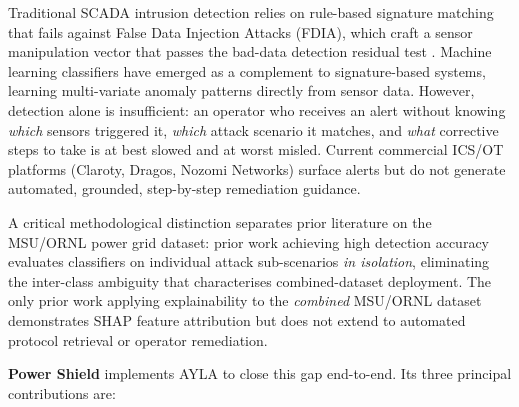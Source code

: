 \documentclass[twocolumn, 10pt, letterpaper]{article}
\begin{document}
Traditional SCADA intrusion detection relies on rule-based signature matching that
fails against False Data Injection Attacks (FDIA), which craft a sensor manipulation
vector that passes the bad-data detection residual test \cite{liu2011fdia}.
Machine learning classifiers have emerged as a complement to signature-based systems,
learning multi-variate anomaly patterns directly from sensor data.
However, detection alone is insufficient: an operator who receives an alert without
knowing \textit{which} sensors triggered it, \textit{which} attack scenario it matches,
and \textit{what} corrective steps to take is at best slowed and at worst misled.
Current commercial ICS/OT platforms (Claroty, Dragos, Nozomi Networks) surface alerts
but do not generate automated, grounded, step-by-step remediation guidance.

A critical methodological distinction separates prior literature on the
MSU/ORNL power grid dataset: prior work achieving high detection accuracy
\cite{panthi2022ensemble,naeem2025deep,graphkan2025} evaluates classifiers on
individual attack sub-scenarios \textit{in isolation}, eliminating the inter-class
ambiguity that characterises combined-dataset deployment.
The only prior work applying explainability to the \textit{combined} MSU/ORNL dataset
\cite{shapgrid2026} demonstrates SHAP feature attribution but does not extend
to automated protocol retrieval or operator remediation.

\textbf{Power Shield} implements AYLA to close this gap end-to-end.
Its three principal contributions are:
\end{document}
